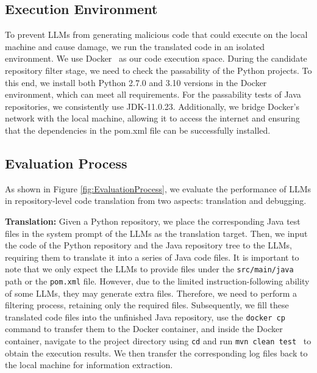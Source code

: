 \subsection{Execution Environment}  
To prevent LLMs from generating malicious code that could execute on the local machine and cause damage, we run the translated code in an isolated environment. We use Docker~\cite{docker} as our code execution space. During the candidate repository filter stage, we need to check the passability of the Python projects. To this end, we install both Python 2.7.0 and 3.10 versions in the Docker environment, which can meet all requirements. For the passability tests of Java repositories, we consistently use JDK-11.0.23. Additionally, we bridge Docker's network with the local machine, allowing it to access the internet and ensuring that the dependencies in the pom.xml file can be successfully installed.

\subsection{Evaluation Process}

As shown in Figure \ref{fig:EvaluationProcess}, we evaluate the performance of LLMs in repository-level code translation from two aspects: translation and debugging.

\textbf{Translation:} Given a Python repository, we place the corresponding Java test files in the system prompt of the LLMs as the translation target. Then, we input the code of the Python repository and the Java repository tree to the LLMs, requiring them to translate it into a series of Java code files. It is important to note that we only expect the LLMs to provide files under the \texttt{src/main/java} path or the \texttt{pom.xml} file. However, due to the limited instruction-following ability of some LLMs, they may generate extra files. Therefore, we need to perform a filtering process, retaining only the required files. Subsequently, we fill these translated code files into the unfinished Java repository, use the \texttt{docker cp} command to transfer them to the Docker container, and inside the Docker container, navigate to the project directory using \texttt{cd} and run \texttt{mvn clean test}~\cite{pan2024lost} to obtain the execution results. We then transfer the corresponding log files back to the local machine for information extraction.

